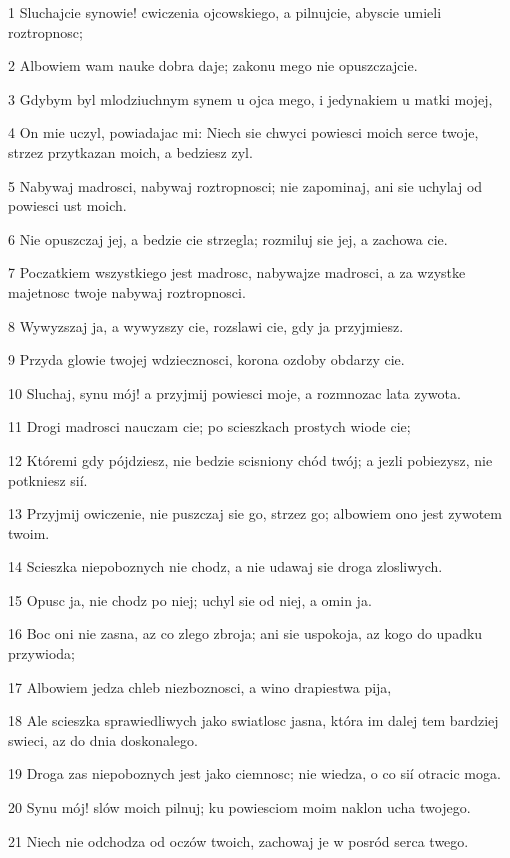 \par 1 Sluchajcie synowie! cwiczenia ojcowskiego, a pilnujcie, abyscie umieli roztropnosc;
\par 2 Albowiem wam nauke dobra daje; zakonu mego nie opuszczajcie.
\par 3 Gdybym byl mlodziuchnym synem u ojca mego, i jedynakiem u matki mojej,
\par 4 On mie uczyl, powiadajac mi: Niech sie chwyci powiesci moich serce twoje, strzez przytkazan moich, a bedziesz zyl.
\par 5 Nabywaj madrosci, nabywaj roztropnosci; nie zapominaj, ani sie uchylaj od powiesci ust moich.
\par 6 Nie opuszczaj jej, a bedzie cie strzegla; rozmiluj sie jej, a zachowa cie.
\par 7 Poczatkiem wszystkiego jest madrosc, nabywajze madrosci, a za wzystke majetnosc twoje nabywaj roztropnosci.
\par 8 Wywyzszaj ja, a wywyzszy cie, rozslawi cie, gdy ja przyjmiesz.
\par 9 Przyda glowie twojej wdziecznosci, korona ozdoby obdarzy cie.
\par 10 Sluchaj, synu mój! a przyjmij powiesci moje, a rozmnozac lata zywota.
\par 11 Drogi madrosci nauczam cie; po scieszkach prostych wiode cie;
\par 12 Któremi gdy pójdziesz, nie bedzie scisniony chód twój; a jezli pobiezysz, nie potkniesz sií.
\par 13 Przyjmij owiczenie, nie puszczaj sie go, strzez go; albowiem ono jest zywotem twoim.
\par 14 Scieszka niepoboznych nie chodz, a nie udawaj sie droga zlosliwych.
\par 15 Opusc ja, nie chodz po niej; uchyl sie od niej, a omin ja.
\par 16 Boc oni nie zasna, az co zlego zbroja; ani sie uspokoja, az kogo do upadku przywioda;
\par 17 Albowiem jedza chleb niezboznosci, a wino drapiestwa pija,
\par 18 Ale scieszka sprawiedliwych jako swiatlosc jasna, która im dalej tem bardziej swieci, az do dnia doskonalego.
\par 19 Droga zas niepoboznych jest jako ciemnosc; nie wiedza, o co sií otracic moga.
\par 20 Synu mój! slów moich pilnuj; ku powiesciom moim naklon ucha twojego.
\par 21 Niech nie odchodza od oczów twoich, zachowaj je w posród serca twego.

